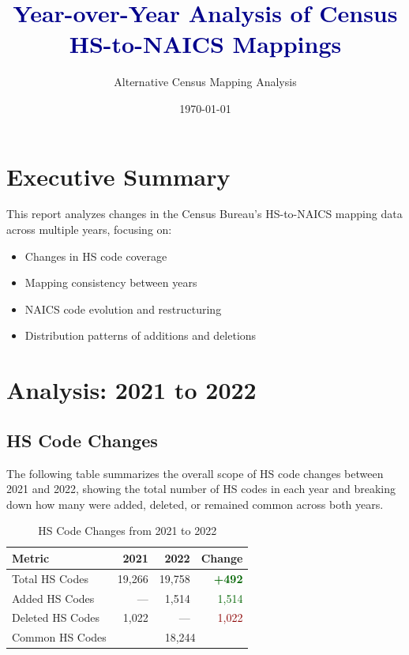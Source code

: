 \documentclass[11pt]{article}
\newcommand{\increase}[1]{\textcolor{darkgreen}{\textbf{+#1}}}
\begin{document}
\title{\textcolor{darkblue}{\textbf{Year-over-Year Analysis of Census HS-to-NAICS Mappings}}}
\author{Alternative Census Mapping Analysis}
\date{\today}
\maketitle

\section{Executive Summary}

This report analyzes changes in the Census Bureau's HS-to-NAICS mapping data across multiple years, focusing on:
\begin{itemize}
    \item Changes in HS code coverage
    \item Mapping consistency between years
    \item NAICS code evolution and restructuring
    \item Distribution patterns of additions and deletions
\end{itemize}


\section{Analysis: 2021 to 2022}

\subsection{HS Code Changes}

The following table summarizes the overall scope of HS code changes between 2021 and 2022, showing the total number of HS codes in each year and breaking down how many were added, deleted, or remained common across both years.

\begin{table}[H]
\centering
{}
\begin{tabular}{lrrr}
\toprule
\textbf{Metric} & \textbf{2021} & \textbf{2022} & \textbf{Change} \\
\midrule
Total HS Codes & 19,266 & 19,758 & \increase{492} \\
Added HS Codes & --- & 1,514 & \textcolor{darkgreen}{1,514} \\
Deleted HS Codes & 1,022 & --- & \textcolor{darkred}{1,022} \\
Common HS Codes & \multicolumn{3}{c}{18,244} \\
\bottomrule
\end{tabular}
\caption{HS Code Changes from 2021 to 2022}
\end{table}
\end{document}
